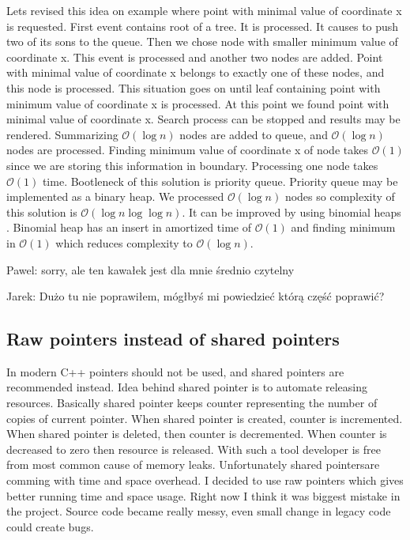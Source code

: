 \documentclass[10pt,a4paper]{article}
\newcommand{\pawel}[1]{\noindent\colorbox{myRed}{Pawel: #1}}
\newcommand{\jarek}[1]{\noindent\colorbox{myYellow}{Jarek: #1}}
\newcommand{\Oh}{\mathcal{O}}
\begin{document}
Lets revised this idea on example where point with minimal value of coordinate x is requested. First event contains root of a tree. It is processed. It causes to push two of its sons to the queue. Then we chose node with smaller minimum value of coordinate x. This event is processed and another two nodes are added. Point with minimal value of coordinate x belongs to exactly one of these nodes, and this node is processed. This situation goes on until leaf containing point with minimum value of coordinate x is processed. At this point we found point with minimal value of coordinate x. Search process can be stopped and results may be rendered. Summarizing $\Oh(\log n)$ nodes are added to queue, and $\Oh(\log n)$ nodes are processed. Finding minimum value of coordinate x of node takes $\Oh(1)$ since we are storing this information in boundary. Processing one node takes $\Oh(1)$ time. Bootleneck of this solution is priority queue. Priority queue may be implemented as a binary heap. We processed $\Oh(\log n)$ nodes so complexity of this solution is $\Oh(\log n \log \log n)$. It can be improved by using binomial heaps \cite{BINOMHEAPS}. Binomial heap has an insert in amortized time of $\Oh(1)$ and finding minimum in $\Oh(1)$ which reduces complexity to $\Oh(\log n)$.

\pawel{sorry, ale ten kawałek jest dla mnie średnio czytelny}

\jarek{Dużo tu nie poprawiłem, mógłbyś mi powiedzieć którą część poprawić?}

\subsection{Raw pointers instead of shared pointers}

In modern C++ pointers should not be used, and shared pointers are recommended instead. Idea behind shared pointer is to automate releasing resources. Basically shared pointer keeps counter representing the number of copies of current pointer. When shared pointer is created, counter is incremented. When shared pointer is deleted, then counter is decremented. When counter is decreased to zero then resource is released. With such a tool developer is free from most common cause of memory leaks. Unfortunately shared pointersare comming with time and space overhead. I decided to use raw pointers which gives better running time and space usage.
Right now I think it was biggest mistake in the project. Source code became really messy, even small change in legacy code could create bugs.
\end{document}
